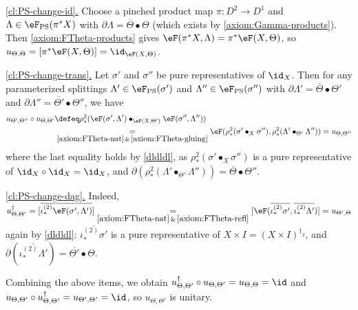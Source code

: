 \documentclass[12pt,reqno]{amsart}
\newcommand{\blt}{\bullet}
\newcommand{\fcj}[1]{\overline{#1}}
\newcommand{\orev}{\overline}
\newcommand{\itemstep}[1]{\smallskip\noindent\underline{#1}}
\begin{document}
\begin{pf}
\itemstep{\ref{cl:PS-change-id}.} Choose a pinched product map $\pi\colon D^2\to D^1$ and $\Lambda\in\eF_{\mathrm{PS}}(\pi^*X)$ with $\partial\Lambda=\orev\Theta\blt\Theta$ (which exists by \ref{axiom:Gamma-products}). Then \ref{axiom:FTheta-products} gives $\eF(\pi^*X,\Lambda)=\pi^*\eF(X,\Theta)$, so $u_{\Theta,\Theta}=[\pi^*\eF(X,\Theta)]=\id_{\eF(X,\Theta)}$.

\itemstep{\ref{cl:PS-change-trans}.} Let $\sigma'$ and $\sigma''$ be pure representatives of $\id_X$. Then for any parameterized splittings $\Lambda'\in\eF_{\mathrm{PS}}(\sigma')$ and $\Lambda''\in\eF_{\mathrm{PS}}(\sigma'')$ with $\partial\Lambda'=\orev\Theta\blt\Theta'$ and $\partial\Lambda''=\orev{\Theta'}\blt\Theta''$, we have
\begin{align*}
u_{\Theta',\Theta''}\circ u_{\Theta,\Theta'}
&
\defeq
\rho^2_*(\eF(\sigma',\Lambda')\blt_{\eF(X,\Theta')}\eF(\sigma'',\Lambda''))
\\&
\underset{\ref{axiom:FTheta-nat}\,\&\,\ref{axiom:FTheta-gluing}}{=}
\eF(\rho^2_*(\sigma'\blt_X\sigma''),\rho^2_*(\Lambda'\blt_{\Theta'}\Lambda''))
=u_{\Theta,\Theta''}
\end{align*}
where the last equality holds by \cref{dldldl}, as $\rho^2_*(\sigma'\blt_X\sigma'')$ is a pure representative of $\id_X\circ\id_X=\id_X$, and $\partial(\rho^2_*(\Lambda'\blt_{\Theta'}\Lambda''))=\orev\Theta\blt\Theta''$.

\itemstep{\ref{cl:PS-change-dag}.} Indeed, $u_{\Theta,\Theta'}^\dag=[\fcj{\iota^{(2)}_*\eF(\sigma',\Lambda')}]\underset{\ref{axiom:FTheta-nat}\,\&\,\ref{axiom:FTheta-refl}}{=}[\eF(\fcj{\iota^{(2)}_*\sigma'},\fcj{\iota^{(2)}_*\Lambda'})]=u_{\Theta',\Theta}$ again by \cref{dldldl}: $\fcj{\iota^{(2)}_*\sigma'}$ is a pure representative of $X\times I=(X\times I)^{\dag_2}$, and $\partial(\fcj{\iota^{(2)}_*\Lambda'})=\orev{\Theta'}\blt\Theta$. 

Combining the above items, we obtain $u_{\Theta,\Theta'}^\dag\circ u_{\Theta,\Theta'}=u_{\Theta,\Theta}=\id$ and $u_{\Theta,\Theta'}\circ u_{\Theta,\Theta'}^\dag=u_{\Theta',\Theta'}=\id$, so $u_{\Theta,\Theta'}$ is unitary. 
\end{pf}
\end{document}
